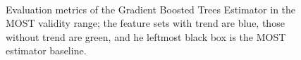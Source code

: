 \documentclass[a4paper]{book}
\begin{document}
\begin{figure}[h]
\hfill
{}\\

    \caption{Evaluation metrics of the Gradient Boosted Trees Estimator in the MOST validity range; the feature sets with trend are blue, those without trend are green, and he leftmost black box is the MOST estimator baseline.}
	\label{fig:gbr_results_most}
\end{figure}
\end{document}
